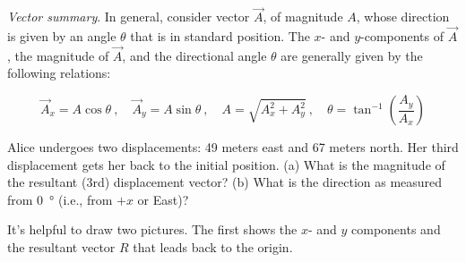 \documentclass{article}
\begin{document}
\begin{mdframed}[backgroundcolor=black!10]
\textit{Vector summary}. In general, consider vector $\vec{A}$, of magnitude $A$, whose direction is given by an angle $\theta$ that is in standard position. The $x$- and $y$-components of $\vec{A}$, the magnitude of $\vec{A}$, and the directional angle $\theta$ are generally given by the following relations: 

\begin{equation*}
    \vec{A}_x = A \cos{\theta}\ , \hspace{1em}
    \vec{A}_y = A \sin{\theta}\ , \hspace{1em}
    A = \sqrt{A_x^2 + A_y^2}\ , \hspace{1em}
    \theta = \tan^{-1}\left(\frac{A_y}{A_x}\right)
\end{equation*}
\end{mdframed}

\begin{figure}[h!]
    \centering
    \pgfplotsset{compat=1.11}
    \def\A{6}
    \def\angle{55}
\end{figure}

\begin{example}
    Alice undergoes two displacements: 49 meters east and 67 meters north. Her third displacement gets her back to the initial position. (a) What is the magnitude of the resultant (3rd) displacement vector? (b) What is the direction as measured from \SI{0}{\degree} (i.e., from $+x$ or East)?
\end{example}

\Solution It's helpful to draw two pictures. The first shows the $x$- and $y$ components and the resultant vector $R$ that leads back to the origin.
\end{document}
